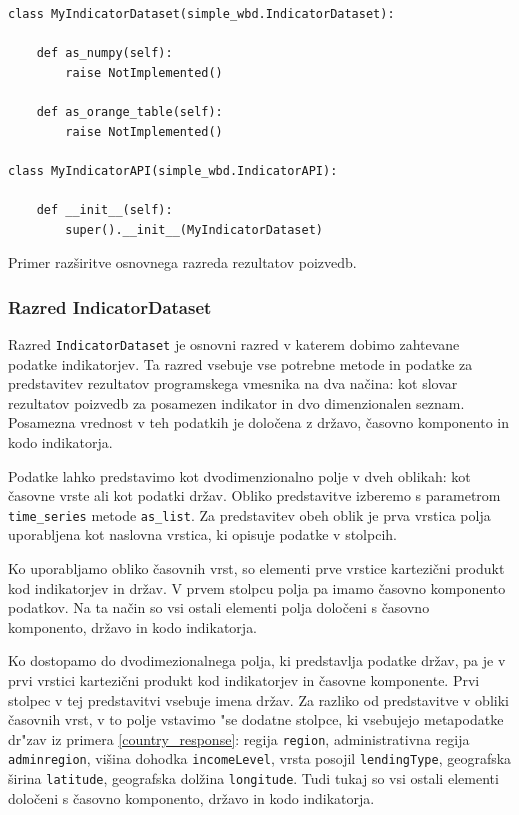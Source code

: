 \begin{snippet}
\begin{center}
\begin{lstlisting}
class MyIndicatorDataset(simple_wbd.IndicatorDataset):
    
    def as_numpy(self):
        raise NotImplemented()
    
    def as_orange_table(self):
        raise NotImplemented()

class MyIndicatorAPI(simple_wbd.IndicatorAPI):

    def __init__(self):
        super().__init__(MyIndicatorDataset)
\end{lstlisting}
\end{center}
\caption[some]{Primer razširitve osnovnega razreda rezultatov poizvedb.}
\label{indicator_api_extend}
\end{snippet} 


\subsubsection{Razred IndicatorDataset}
\label{razred_indicatordatasets}

Razred \verb|IndicatorDataset| je osnovni razred v katerem dobimo zahtevane 
podatke indikatorjev. Ta razred vsebuje vse potrebne metode in podatke za 
predstavitev rezultatov programskega vmesnika na dva načina: kot slovar
rezultatov poizvedb za posamezen indikator in dvo dimenzionalen seznam. 
Posamezna vrednost v teh podatkih je določena z državo, časovno komponento in 
kodo indikatorja. 

Podatke lahko predstavimo kot dvodimenzionalno polje v dveh oblikah: kot
časovne vrste ali kot podatki držav. Obliko predstavitve izberemo s
parametrom \verb|time_series| metode \verb|as_list|. Za predstavitev obeh oblik
je prva vrstica polja uporabljena kot naslovna vrstica, ki opisuje podatke v 
stolpcih.

Ko uporabljamo obliko časovnih vrst, so elementi prve vrstice kartezični
produkt kod indikatorjev in držav. V prvem stolpcu polja pa imamo časovno
komponento podatkov. Na ta način so vsi ostali elementi polja določeni s 
časovno komponento, državo in kodo indikatorja.

Ko dostopamo do dvodimezionalnega polja, ki predstavlja podatke držav, pa je v
prvi vrstici kartezični produkt kod indikatorjev in časovne komponente. Prvi
stolpec v tej predstavitvi vsebuje imena držav. Za razliko od predstavitve v 
obliki časovnih vrst, v to polje vstavimo "se dodatne stolpce, ki vsebujejo
metapodatke dr"zav iz primera \ref{country_response}: regija \verb|region|, 
administrativna regija \verb|adminregion|, višina dohodka \verb|incomeLevel|, 
vrsta posojil \verb|lendingType|, geografska širina \verb|latitude|, 
geografska dolžina \verb|longitude|. Tudi tukaj so vsi ostali elementi določeni s
časovno komponento, državo in kodo indikatorja. 


